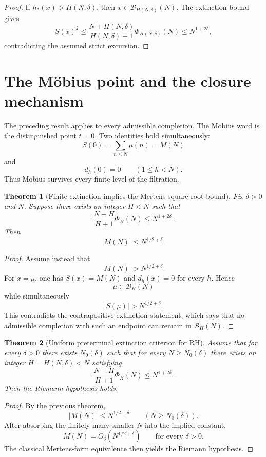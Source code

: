 \documentclass[11pt]{article}
\newtheorem{theorem}{Theorem}[section]
\theoremstyle{definition}
\theoremstyle{remark}
\newcommand{\BH}{\mathcal B}
\begin{document}
\begin{proof}
If $h_*(x)>H(N,\delta)$, then $x\in\BH_{H(N,\delta)}(N)$.  The extinction bound gives
\[
S(x)^2
\le
\frac{N+H(N,\delta)}{H(N,\delta)+1}\Phi_{H(N,\delta)}(N)
\le N^{1+2\delta},
\]
contradicting the assumed strict excursion.
\end{proof}

\section{The M\"obius point and the closure mechanism}

The preceding result applies to every admissible completion.  The M\"obius word is the distinguished point $t=0$.  Two identities hold simultaneously:
\[
S(0)=\sum_{n\le N}\mu(n)=M(N)
\]
and
\[
d_h(0)=0\qquad(1\le h<N).
\]
Thus M\"obius survives every finite level of the filtration.

\begin{theorem}[Finite extinction implies the Mertens square-root bound]
Fix $\delta>0$ and $N$.  Suppose there exists an integer $H<N$ such that
\[
\frac{N+H}{H+1}\Phi_H(N)\le N^{1+2\delta}.
\]
Then
\[
\boxed{|M(N)|\le N^{1/2+\delta}.}
\]
\end{theorem}

\begin{proof}
Assume instead that
\[
|M(N)|>N^{1/2+\delta}.
\]
For $x=\mu$, one has $S(x)=M(N)$ and $d_h(x)=0$ for every $h$.  Hence
\[
\mu\in\BH_H(N)
\]
while simultaneously
\[
|S(\mu)|>N^{1/2+\delta}.
\]
This contradicts the contrapositive extinction statement, which says that no admissible completion with such an endpoint can remain in $\BH_H(N)$.
\end{proof}

\begin{theorem}[Uniform preterminal extinction criterion for RH]
Assume that for every $\delta>0$ there exists $N_0(\delta)$ such that for every $N\ge N_0(\delta)$ there exists an integer $H=H(N,\delta)<N$ satisfying
\[
\boxed{
\frac{N+H}{H+1}\Phi_H(N)\le N^{1+2\delta}.
}
\tag{UE}
\]
Then the Riemann hypothesis holds.
\end{theorem}

\begin{proof}
By the previous theorem,
\[
|M(N)|\le N^{1/2+\delta}
\qquad(N\ge N_0(\delta)).
\]
After absorbing the finitely many smaller $N$ into the implied constant,
\[
M(N)=O_\delta(N^{1/2+\delta})
\qquad\text{for every }\delta>0.
\]
The classical Mertens-form equivalence then yields the Riemann hypothesis.
\end{proof}
\end{document}
